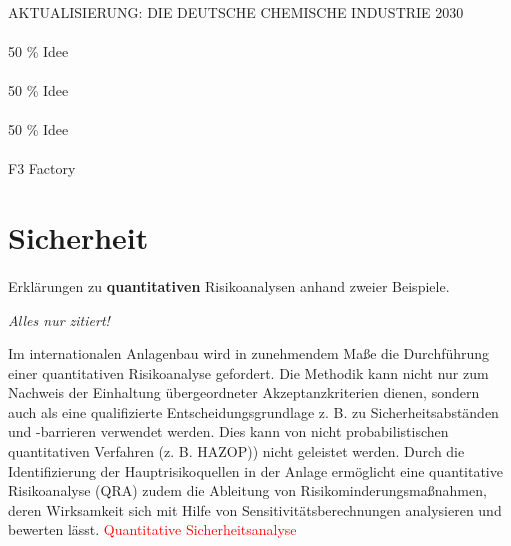 \paragraph*{\cite{PerspektiveC_2016}} AKTUALISIERUNG: DIE DEUTSCHE CHEMISCHE INDUSTRIE 2030

\paragraph*{\cite{Schembecker_2009}} 50 \% Idee
\paragraph*{\cite{Processnet_2010}}50 \% Idee
\paragraph*{\cite{Processnet_2009}}50 \% Idee
\paragraph*{\cite{f3_2014}} F3 Factory
\paragraph*{\cite{copiride_2014}}

\section{Sicherheit}
\paragraph*{\cite{Rath_2009}} Erkl\"arungen zu \textbf{quantitativen} Risikoanalysen anhand zweier Beispiele. \hfill \newline

\textit{Alles nur zitiert!} \hfill \newline

Im internationalen Anlagenbau wird in zunehmendem Ma\ss{}e die Durchf\"uhrung einer quantitativen Risikoanalyse gefordert. Die Methodik kann nicht nur zum Nachweis der Einhaltung \"ubergeordneter Akzeptanzkriterien dienen, sondern auch als eine qualifizierte Entscheidungsgrundlage z. B. zu Sicherheitsabst\"anden und -barrieren verwendet werden. Dies kann von nicht probabilistischen quantitativen Verfahren (z. B. HAZOP)) nicht geleistet werden. Durch die Identifizierung der Hauptrisikoquellen in der Anlage erm\"oglicht eine quantitative Risikoanalyse (QRA) zudem die Ableitung von Risikominderungsma\ss{}nahmen, deren
Wirksamkeit sich mit Hilfe von Sensitivit\"atsberechnungen analysieren und bewerten l\"asst. \textcolor{red}{Quantitative Sicherheitsanalyse}

